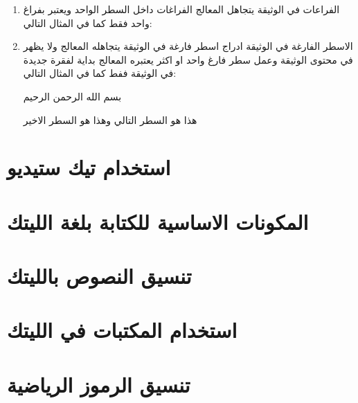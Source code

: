 \begin{enumerate}
\begin{mybox}
\end{mybox}
\item{الفراعات في الوثيقة}
يتجاهل المعالج الفراغات داخل السطر الواحد ويعتبر بفراغ واحد فقط كما في المثال التالي:
\begin{mybox}

\end{mybox}
\item{الاسطر الفارغة في الوثيقة}
ادراج اسطر فارغة في الوثيقة يتجاهله المعالج ولا يظهر في محتوى الوثيقة وعمل سطر فارغ واحد او اكثر يعتبره المعالج بداية لفقرة جديدة في الوثيقة ففط كما في المثال التالي:
\begin{mybox}
بسم الله الرحمن الرحيم

هذا هو السطر التالي
وهذا هو السطر الاخير
\end{mybox} 
\end{enumerate} 
\section{استخدام تيك ستيديو}
\section{المكونات الاساسية للكتابة بلغة الليتك}
\section{تنسيق النصوص بالليتك}
\section{استخدام المكتبات في الليتك}
\section{تنسيق الرموز الرياضية}

